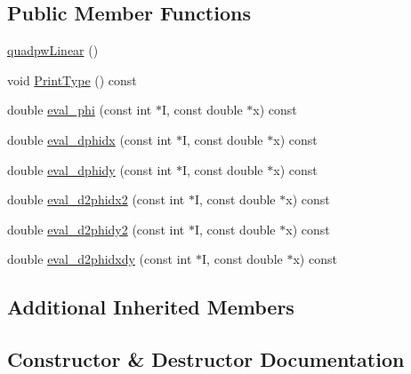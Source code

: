 \subsection*{Public Member Functions}
\begin{DoxyCompactItemize}
\item 
\mbox{\hyperlink{classfemus_1_1quadpw_linear_ac2133a7f3c3bbacf5dd75c6c76e7f482}{quadpw\+Linear}} ()
\item 
void \mbox{\hyperlink{classfemus_1_1quadpw_linear_adb6d97e1f50de6b3567a754897517aa9}{Print\+Type}} () const
\item 
double \mbox{\hyperlink{classfemus_1_1quadpw_linear_a6baa7f92c07d7f745c0f8020e267c8d6}{eval\+\_\+phi}} (const int $\ast$I, const double $\ast$x) const
\item 
double \mbox{\hyperlink{classfemus_1_1quadpw_linear_adb19c2091a0836195c299f901ac4bded}{eval\+\_\+dphidx}} (const int $\ast$I, const double $\ast$x) const
\item 
double \mbox{\hyperlink{classfemus_1_1quadpw_linear_aef9781d267a0a0a6af0b47e71bba9ec3}{eval\+\_\+dphidy}} (const int $\ast$I, const double $\ast$x) const
\item 
double \mbox{\hyperlink{classfemus_1_1quadpw_linear_a1e4149a8bc6f1a9c6cd12640b15e6deb}{eval\+\_\+d2phidx2}} (const int $\ast$I, const double $\ast$x) const
\item 
double \mbox{\hyperlink{classfemus_1_1quadpw_linear_a0600555381447b94613958383fe5f69f}{eval\+\_\+d2phidy2}} (const int $\ast$I, const double $\ast$x) const
\item 
double \mbox{\hyperlink{classfemus_1_1quadpw_linear_a5e98b28c5ca4e382d3bf0ac7f1f3aa0c}{eval\+\_\+d2phidxdy}} (const int $\ast$I, const double $\ast$x) const
\end{DoxyCompactItemize}
\subsection*{Additional Inherited Members}


\subsection{Constructor \& Destructor Documentation}
\mbox{\label{classfemus_1_1quadpw_linear_ac2133a7f3c3bbacf5dd75c6c76e7f482}} 

